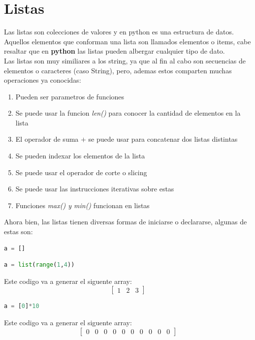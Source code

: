 \documentclass{article}
\begin{document}
\section{Listas}
Las listas son colecciones de valores y en python es una estructura de datos. Aquellos elementos que conforman una lista son llamados elementos o items, cabe resaltar que en \textbf{python} las listas pueden albergar cualquier tipo de dato. \\
Las listas son muy similiares a los string, ya que al fin al cabo son secuencias de elementos o caracteres (caso String), pero, ademas estos comparten muchas operaciones ya conocidas:
\begin{enumerate}
    \item Pueden ser parametros de funciones
    \item Se puede usar la funcion \textit{len()} para conocer la cantidad de elementos en la lista
    \item El operador de suma \(+\) se puede usar para concatenar dos listas distintas
    \item Se pueden indexar los elementos de la lista
    \item Se puede usar el operador de corte o slicing 
    \item Se puede usar las instrucciones iterativas sobre estas
    \item Funciones \textit{max() y min()} funcionan en listas
\end{enumerate}
Ahora bien, las listas tienen diversas formas de iniciarse o declararse, algunas de estas son:
\begin{lstlisting}[language=Python, caption= Declaracion de una lista]
a = []
\end{lstlisting}
\begin{lstlisting}[language=Python, caption= Combinacion de List y Range para generar una lista]
a = list(range(1,4))
\end{lstlisting}
Este codigo va a generar el siguente array:
\[[
\begin{array}{ccc}
    1 & 2 & 3
\end{array}
]
\]
\begin{lstlisting}[language=Python, caption= Operador de multiplicacion para generar una lista]
a = [0]*10
\end{lstlisting}
Este codigo va a generar el siguente array:
\[[
\begin{array}{cccccccccc}
    0 & 0 & 0 & 0 & 0 & 0 & 0 & 0 & 0 & 0 
\end{array}
]
\]
\end{document}
